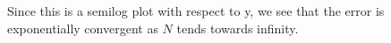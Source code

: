 \begin{solution}
    Since this is a semilog plot with respect to y, we see that the error is exponentially convergent
    as $N$ tends towards infinity.

\end{solution}

\newpage

\newpage